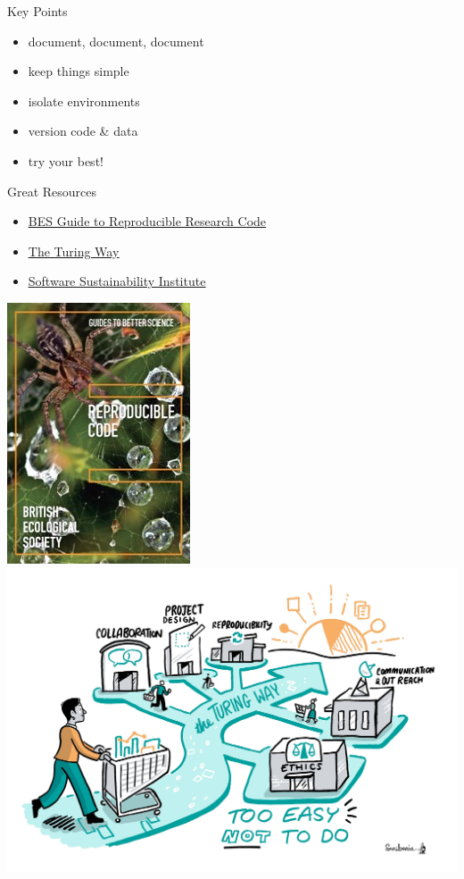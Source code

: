 \documentclass{beamer} %
\begin{document}
  \begin{frame}{Key Points}
    \begin{itemize}
      \item document, document, document
      \item keep things simple
      \item isolate environments
      \item version code \& data
      \item try your best!
    \end{itemize}
  \end{frame}

  \begin{frame}{Great Resources}
    \begin{itemize}
      \item \href{https://www.britishecologicalsociety.org/wp-content/uploads/2017/12/guide-to-reproducible-code.pdf}{\underline{BES Guide to Reproducible Research Code}}
      \item \href{https://the-turing-way.netlify.app/}{\underline{The Turing Way}}
      \item \href{https://software.ac.uk/}{\underline{Software Sustainability Institute}}
    \end{itemize}
    \begin{center}
      \includegraphics[height=0.4\textheight]{bes_reproducible_code.jpg}
      \hspace{1cm}
      \includegraphics[height=0.4\textheight]{turing_way.jpg}
    \end{center}
  \end{frame}
\end{document}
